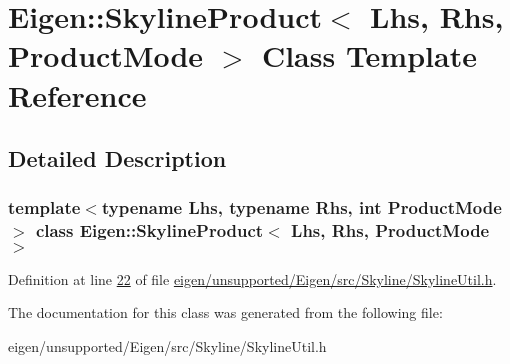 \hypertarget{class_eigen_1_1_skyline_product}{}\section{Eigen\+:\+:Skyline\+Product$<$ Lhs, Rhs, Product\+Mode $>$ Class Template Reference}
\label{class_eigen_1_1_skyline_product}


\subsection{Detailed Description}
\subsubsection*{template$<$typename Lhs, typename Rhs, int Product\+Mode$>$\newline
class Eigen\+::\+Skyline\+Product$<$ Lhs, Rhs, Product\+Mode $>$}



Definition at line \hyperlink{eigen_2unsupported_2_eigen_2src_2_skyline_2_skyline_util_8h_source_l00022}{22} of file \hyperlink{eigen_2unsupported_2_eigen_2src_2_skyline_2_skyline_util_8h_source}{eigen/unsupported/\+Eigen/src/\+Skyline/\+Skyline\+Util.\+h}.



The documentation for this class was generated from the following file\+:\begin{DoxyCompactItemize}
\item 
eigen/unsupported/\+Eigen/src/\+Skyline/\+Skyline\+Util.\+h\end{DoxyCompactItemize}
